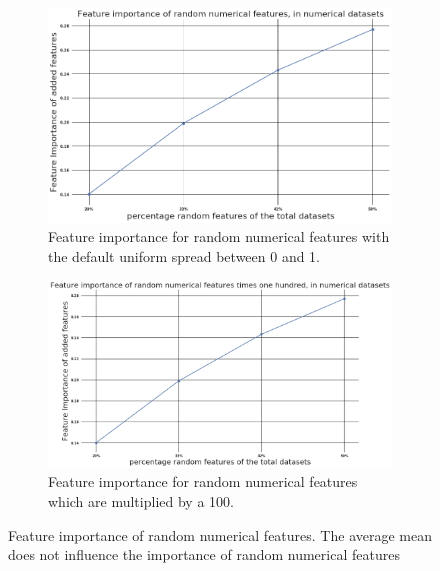 \documentclass[a4paper,10pt]{article}
\begin{document}
\begin{figure}[H]
	\centering
	\begin{subfigure}[b]{0.45\textwidth}
		\includegraphics[width=\textwidth]{images/MetaFeatures/FeatureImportanceNum1.png}
		\caption{Feature importance for random numerical features with the default uniform spread between 0 and 1.}
		\label{fig:FIN3}
	\end{subfigure}
	\begin{subfigure}[b]{0.45\textwidth}
		\includegraphics[width=\textwidth]{images/MetaFeatures/FeatureImportanceNum100.png}
		\caption{Feature importance for random numerical features which are multiplied by a 100.}
		\label{fig:FIN100}
	\end{subfigure}
	\caption{Feature importance of random numerical features. The average mean does not influence the importance of random numerical features}\label{fig:FIN}
\end{figure}
\end{document}
